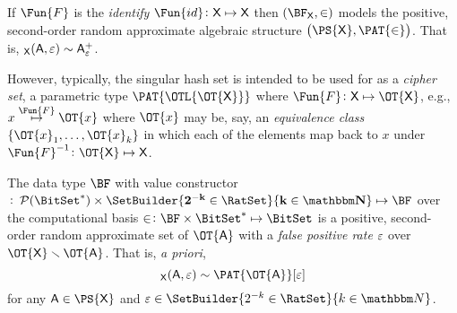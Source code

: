 \documentclass[ ../main.tex]{subfiles}
\begin{document}
If $\Fun{F}$ is the \emph{identify} $\Fun{id} \colon \Set{X} \mapsto \Set{X}$ then $\left(\BF_{\Set{X}}, \SetContains\right)$ models the positive, second-order random approximate algebraic structure $\left(\PS{\Set{X}},\PAT{\SetContains}\right)$.
That is, $\bf_{\Set{X}}(\Set{A},\fprate) \sim \PASet{A}[\fprate]$.

However, typically, the singular hash set is intended to be used for as a \emph{cipher set}, a parametric type $\PAT{\OTL{\OT{\Set{X}}}}$ where $\Fun{F} \colon \Set{X} \mapsto \OT{\Set{X}}$, e.g., $x \overset{\Fun{F}}{\mapsto} \OT{x}$ where $\OT{x}$ may be, say, an \emph{equivalence class} $\{\OT{x}_1,\ldots,\OT{x}_k\}$ in which each of the elements map back to $x$ under $\Fun{F}^{-1} \colon \OT{\Set{X}} \mapsto \Set{X}$.

\begin{theorem}
The data type $\BF$ with value constructor $\bf \colon \PowerSet(\BitSet^*) \times \SetBuilder{2^{-k} \in \RatSet}{k \in \NatSet} \mapsto \BF$ over the computational basis $\SetContains \colon \BF \times \BitSet^* \mapsto \BitSet$ is a positive, second-order random approximate set of $\OT{\Set{A}}$ with a \emph{false positive rate} $\varepsilon$ over $\OT{\Set{X}} \SetDiff \OT{\Set{A}}$.
That is, \emph{a priori},
\begin{equation}
	\bf_{\Set{X}}(\Set{A},\fprate) \sim \PAT{\OT{\Set{A}}}[\fprate]
\end{equation}
for any $\Set{A} \in \PS{\Set{X}}$ and $\fprate \in \SetBuilder{2^{-k} \in \RatSet}{k \in \NatSet}$.
\end{theorem}
\end{document}
